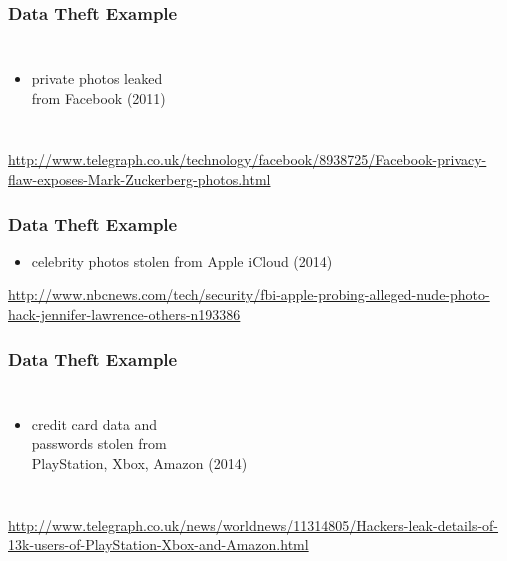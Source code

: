 \documentclass[dvipsnames]{beamer}
\theoremstyle{plain}
\begin{document}
\begin{frame}
  \frametitle{Data Theft Example}

  \begin{columns}

    \begin{itemize}
      \item private photos leaked\\
        from Facebook (2011)
    \end{itemize}
  \end{columns}

  \medskip
  \tiny{\url{http://www.telegraph.co.uk/technology/facebook/8938725/Facebook-privacy-flaw-exposes-Mark-Zuckerberg-photos.html}}\\
\end{frame}

\begin{frame}
  \frametitle{Data Theft Example}

  \begin{itemize}
    \item celebrity photos stolen from Apple iCloud (2014)
  \end{itemize}

  \begin{center}
  \end{center}

  \medskip
  \tiny{\url{http://www.nbcnews.com/tech/security/fbi-apple-probing-alleged-nude-photo-hack-jennifer-lawrence-others-n193386}}\\
\end{frame}

\begin{frame}
  \frametitle{Data Theft Example}

  \begin{columns}

    \begin{itemize}
      \item credit card data and\\
        passwords stolen from\\
        PlayStation, Xbox, Amazon (2014)
    \end{itemize}
  \end{columns}

  \medskip
  \tiny{\url{http://www.telegraph.co.uk/news/worldnews/11314805/Hackers-leak-details-of-13k-users-of-PlayStation-Xbox-and-Amazon.html}}\\
\end{frame}
\end{document}
